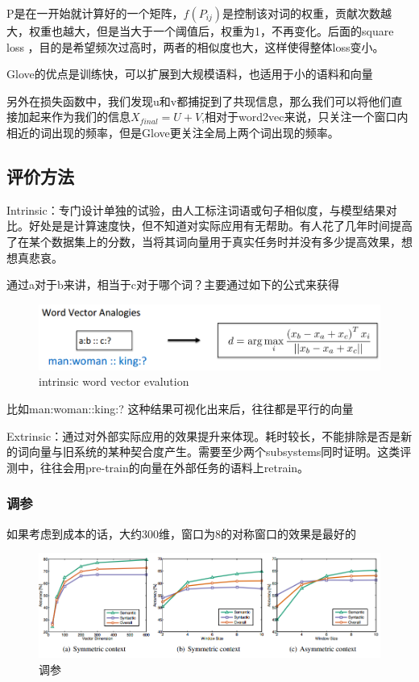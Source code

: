 	P是在一开始就计算好的一个矩阵，$f(P_{ij})$是控制该对词的权重，贡献次数越大，权重也越大，但是当大于一个阈值后，权重为1，不再变化。后面的square loss ，目的是希望频次过高时，两者的相似度也大，这样使得整体loss变小。
	
	Glove的优点是训练快，可以扩展到大规模语料，也适用于小的语料和向量
	
	另外在损失函数中，我们发现u和v都捕捉到了共现信息，那么我们可以将他们直接加起来作为我们的信息$X_{final} = U + V$,相对于word2vec来说，只关注一个窗口内相近的词出现的频率，但是Glove更关注全局上两个词出现的频率。
	
	\subsection{评价方法}
	
	Intrinsic：专门设计单独的试验，由人工标注词语或句子相似度，与模型结果对比。好处是是计算速度快，但不知道对实际应用有无帮助。有人花了几年时间提高了在某个数据集上的分数，当将其词向量用于真实任务时并没有多少提高效果，想想真悲哀。
	
	通过a对于b来讲，相当于c对于哪个词？主要通过如下的公式来获得
	
	\begin{figure}[!htbp]
	\centering\includegraphics[width=6in]{img/6-11.png}
	\caption{intrinsic word vector evalution}\label{fig:6-11}
	\end{figure}
	
	比如man:woman::king:? 这种结果可视化出来后，往往都是平行的向量

	Extrinsic：通过对外部实际应用的效果提升来体现。耗时较长，不能排除是否是新的词向量与旧系统的某种契合度产生。需要至少两个subsystems同时证明。这类评测中，往往会用pre-train的向量在外部任务的语料上retrain。
	
	\subsubsection{调参}
	如果考虑到成本的话，大约300维，窗口为8的对称窗口的效果是最好的
	
	\begin{figure}[!htbp]
	\centering\includegraphics[width=6in]{img/6-12.png}
	\caption{调参}\label{fig:6-12}
	\end{figure}
	
